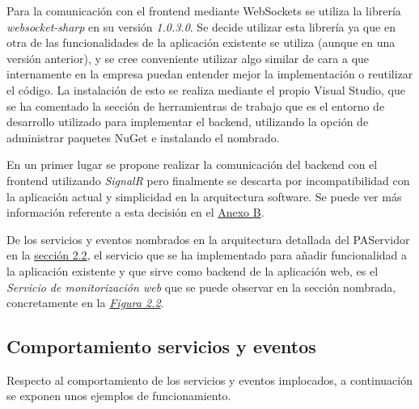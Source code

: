Para la comunicación con el frontend mediante WebSockets se utiliza la librería \textit{websocket-sharp} \cite{websocket-sharp} en su versión \textit{1.0.3.0}.
Se decide utilizar esta librería ya que en otra de las funcionalidades de la aplicación existente se utiliza (aunque en una versión anterior), y se cree conveniente utilizar algo similar de cara a que internamente en la empresa puedan entender mejor la implementación o reutilizar el código.
La instalación de esto se realiza mediante el propio Visual Studio, que se ha comentado la sección de herramientras de trabajo que es el entorno de desarrollo utilizado para implementar el backend, utilizando la opción de administrar paquetes NuGet e instalando el nombrado. \newline 

En un primer lugar se propone realizar la comunicación del backend con el frontend utilizando \textit{SignalR} \cite{signalr} pero finalmente se descarta por incompatibilidad con la aplicación actual y simplicidad en la arquitectura software. Se puede ver más información referente a esta decisión en el \hyperref[anexo-b]{Anexo B}. \newline


De los servicios y eventos nombrados en la arquitectura detallada del PAServidor en la \hyperref[section-arquitectura]{sección 2.2}, el servicio que se ha implementado para añadir funcionalidad a la aplicación existente y que sirve como backend de la aplicación web, es el \textit{Servicio de monitorización web} que se puede observar en la sección nombrada, concretamente en la \hyperref[fig:PAServidor]{\textit{Figura 2.2}}.\\

\subsection{Comportamiento servicios y eventos}
\label{subsection-comportamiento}
Respecto al comportamiento de los servicios y eventos implocados, a continuación se exponen unos ejemplos de funcionamiento.\\

